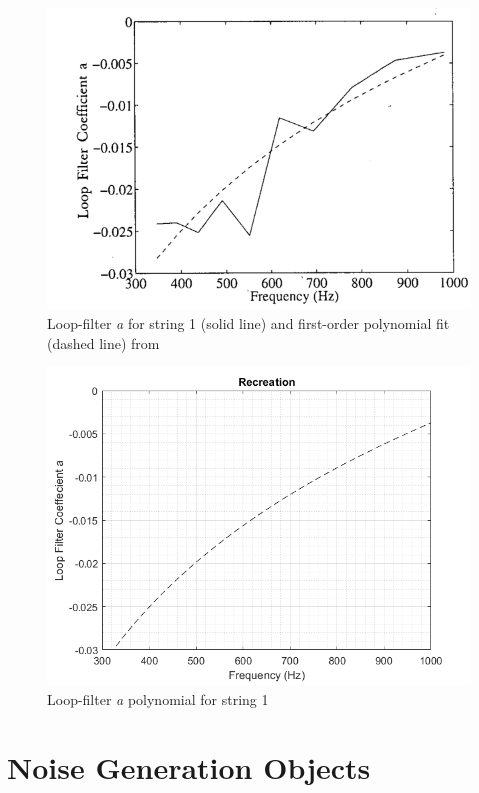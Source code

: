 \documentclass[../main.tex]{subfiles}
\begin{document}
\begin{figure}[h]
    \centering
    \includegraphics[scale=.75]{./images/plots/Figure19Orig.png}
    \caption{Loop-filter \emph{a} for string 1 (solid line) and first-order polynomial fit (dashed line) from }
    \label{fig:Fig19Orig}
\end{figure}

\begin{figure}[h]
    \centering
    \includegraphics[scale=.65]{./images/plots/Figure19Recon.png}
    \caption{Loop-filter \emph{a} polynomial for string 1}
    \label{fig:Fig19Recon}
\end{figure}

\clearpage

\section{Noise Generation Objects}
\end{document}
